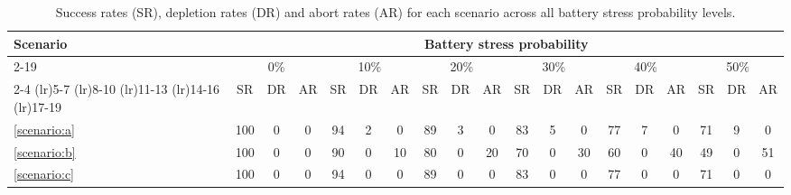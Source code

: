 \begin{table}[t]
\centering
\caption{Success rates (SR), depletion rates (DR) and abort rates (AR) for each scenario across all battery stress probability levels.}
\label{tab:sweep_battery_outcomes}
  \setlength{\tabcolsep}{1pt}
\begin{tabular}{@{}p{1.4cm}|ccc|ccc|ccc|ccc|ccc|ccc|@{}}
\toprule
\multirow{4}{*}{Scenario}    & \multicolumn{18}{c}{Battery stress probability} \\
\cmidrule(lr){2-19}
&\multicolumn{3}{c}{0\%}& \multicolumn{3}{c}{10\%}& \multicolumn{3}{c}{20\%}& \multicolumn{3}{c}{30\%}& \multicolumn{3}{c}{40\%}& \multicolumn{3}{c}{50\%}\\
\cmidrule(lr){2-4} \cmidrule(lr){5-7} \cmidrule(lr){8-10} \cmidrule(lr){11-13} \cmidrule(lr){14-16} \cmidrule(lr){17-19}
&\scriptsize {SR}& \scriptsize {DR} & \scriptsize {AR}& \scriptsize {SR}& \scriptsize {DR} & \scriptsize {AR}& \scriptsize {SR}& \scriptsize {DR} & \scriptsize {AR}& \scriptsize {SR}& \scriptsize {DR} & \scriptsize {AR}& \scriptsize {SR}& \scriptsize {DR} & \scriptsize {AR}& \scriptsize {SR}& \scriptsize {DR} & \scriptsize {AR}\\
\midrule
\ref{scenario:a} & 100 & 0 & 0 & 94 & 2 & 0 & 89 & 3 & 0 & 83 & 5 & 0 & 77 & 7 & 0 & 71 & 9 & 0\\
\ref{scenario:b} & 100 & 0 & 0 & 90 & 0 & 10 & 80 & 0 & 20 & 70 & 0 & 30 & 60 & 0 & 40 & 49 & 0 & 51\\
\ref{scenario:c} & 100 & 0 & 0 & 94 & 0 & 0 & 89 & 0 & 0 & 83 & 0 & 0 & 77 & 0 & 0 & 71 & 0 & 0\\

\bottomrule
\end{tabular}

\end{table}
